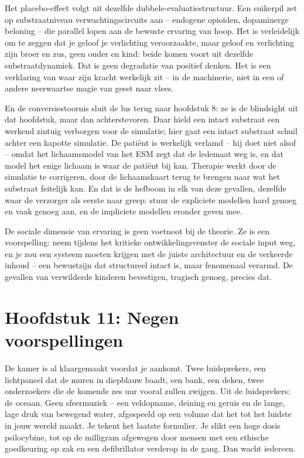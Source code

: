 \documentclass[11pt, twoside, openright]{book}
\begin{document}
Het placebo-effect volgt uit dezelfde dubbele-evaluatiestructuur. Een suikerpil zet op substraatniveau verwachtingscircuits aan -- endogene opioïden, dopaminerge beloning -- die parallel lopen aan de bewuste ervaring van hoop. Het is verleidelijk om te zeggen dat je geloof je verlichting veroorzaakte, maar geloof en verlichting zijn broer en zus, geen ouder en kind: beide komen voort uit dezelfde substraatdynamiek. Dat is geen degradatie van positief denken. Het is een verklaring van waar zijn kracht werkelijk zit -- in de machinerie, niet in een of andere neerwaartse magie van geest naar vlees.

En de conversiestoornis sluit de lus terug naar hoofdstuk 8: ze is de blindsight uit dat hoofdstuk, maar dan achterstevoren. Daar hield een intact substraat een werkend zintuig verborgen voor de simulatie; hier gaat een intact substraat schuil achter een kapotte simulatie. De patiënt is werkelijk verlamd -- hij doet niet alsof -- omdat het lichaamsmodel van het ESM zegt dat de ledemaat weg is, en dat model het enige lichaam is waar de patiënt bij kan. Therapie werkt door de simulatie te corrigeren, door de lichaamskaart terug te brengen naar wat het substraat feitelijk kan. En dat is de hefboom in elk van deze gevallen, dezelfde waar de verzorger als eerste naar greep: stuur de expliciete modellen hard genoeg en vaak genoeg aan, en de impliciete modellen eronder geven mee.

De sociale dimensie van ervaring is geen voetnoot bij de theorie. Ze is een voorspelling: neem tijdens het kritieke ontwikkelingsvenster de sociale input weg, en je zou een systeem moeten krijgen met de juiste architectuur en de verkeerde inhoud -- een bewustzijn dat structureel intact is, maar fenomenaal verarmd. De gevallen van verwilderde kinderen bevestigen, tragisch genoeg, precies dat.


\chapter*{Hoofdstuk 11: Negen voorspellingen}

De kamer is al klaargemaakt voordat je aankomt. Twee luidsprekers, een lichtpaneel dat de muren in diepblauw baadt, een bank, een deken, twee onderzoekers die de komende zes uur vooral zullen zwijgen. Uit de luidsprekers: de oceaan. Geen sfeermuziek -- een veldopname, deining en geruis en de lange, lage druk van bewegend water, afgespeeld op een volume dat het tot het luidste in jouw wereld maakt. Je tekent het laatste formulier. Je slikt een hoge dosis psilocybine, tot op de milligram afgewogen door mensen met een ethische goedkeuring op zak en een defibrillator verderop in de gang. Dan wacht iedereen.
\end{document}
